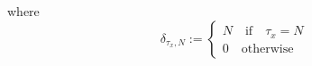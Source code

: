 \documentclass[10pt]{article}
\numberwithin{equation}{section}
\numberwithin{equation}{subsection}
\begin{document}
where 
\begin{equation}
    \delta_{\tau_{x},N}:=\begin{cases}
        N\quad \text{if}\quad \tau_{x}=N\\
        0\quad \text{otherwise}
    \end{cases}
\end{equation}

\end{document}
